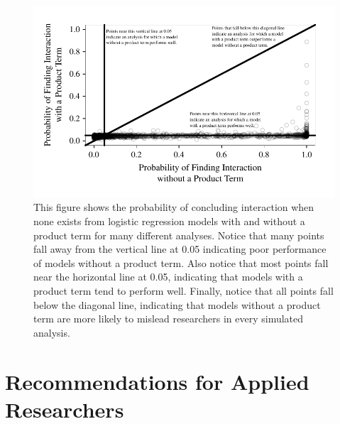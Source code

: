\documentclass[12pt]{article}
\begin{document}
\begin{figure}[H]
\begin{center}
\includegraphics[scale = .9]{fig/fig_scatter2.pdf}
\end{center}\caption{This figure shows the probability of concluding interaction when none exists from logistic regression models with and without a product term for many different analyses. Notice that many points fall away from the vertical line at 0.05 indicating poor performance of models without a product term. Also notice that most points fall near the horizontal line at 0.05, indicating that models with a product term tend to perform well. Finally, notice that  all points fall below the diagonal line, indicating that models without a product term are more likely to mislead researchers in every simulated analysis.}\label{fig:scatter}
\end{figure}

\section*{Recommendations for Applied Researchers}
\end{document}
